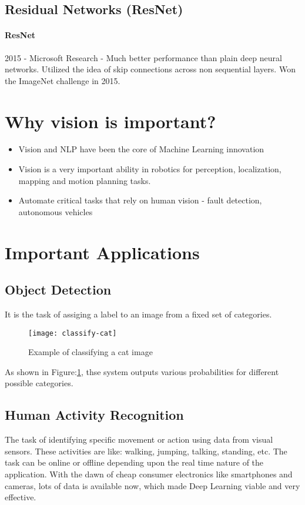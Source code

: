 \documentclass{article}
\begin{document}
	\subsection{Residual Networks (ResNet)}
		\paragraph{ResNet}
		2015 - Microsoft Research - Much better performance than plain deep neural networks. Utilized the idea of skip connections across non sequential layers. Won the ImageNet challenge in 2015.

	\section{Why vision is important?}
	\begin{itemize}
		\item Vision and NLP have been the core of Machine Learning innovation
		\item Vision is a very important ability in robotics for perception, localization, mapping and motion planning tasks.
		\item Automate critical tasks that rely on human vision - fault detection, autonomous vehicles
	\end{itemize}

	
	\section{Important Applications}
		\subsection{Object Detection}
		It is the task of assiging a label to an image from a fixed set of categories.
		\begin{figure}[H]
			\texttt{[image: classify-cat]}
			\caption{Example of classifying a cat image}
			\label{fig:classify-cat}
		\end{figure}
		As shown in Figure:\ref{fig:classify-cat}, thse system outputs various probabilities for different possible categories.
		
		\subsection{Human Activity Recognition}
		The task of identifying specific movement or action using data from visual sensors. These activities are like: walking, jumping, talking, standing, etc. The task can be online or offline depending upon the real time nature of the application. With the dawn of cheap consumer electronics like smartphones and cameras, lots of data is available now, which made Deep Learning viable and very effective.
\end{document}
